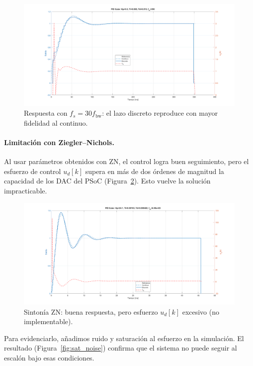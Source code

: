 \begin{figure}[!t]
	\centering
	\includegraphics[width=\columnwidth]{img/fs30.png}
	\caption{Respuesta con $f_s=30 f_{\mathrm{bw}}$: el lazo discreto reproduce con mayor fidelidad al continuo.}
	\label{fig:fs30}
\end{figure}

\paragraph{Limitación con Ziegler--Nichols.}  
Al usar parámetros obtenidos con ZN, el control logra buen seguimiento, pero el esfuerzo de control $u_d[k]$ supera en más de dos órdenes de magnitud la capacidad de los DAC del PSoC (Figura~\ref{fig:zn_effort}). Esto vuelve la solución impracticable.

\begin{figure}[!t]
	\centering
	\includegraphics[width=\columnwidth]{img/zn_effort.png}
	\caption{Sintonía ZN: buena respuesta, pero esfuerzo $u_d[k]$ excesivo (no implementable).}
	\label{fig:zn_effort}
\end{figure}

Para evidenciarlo, añadimos ruido y saturación al esfuerzo en la simulación. El resultado (Figura~\ref{fig:sat_noise}) confirma que el sistema no puede seguir al escalón bajo esas condiciones.

